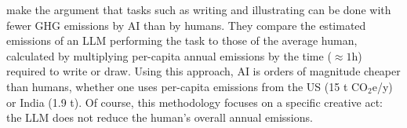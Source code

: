 \documentclass[11pt]{article}
\begin{document}
\textcite{tomlinson2024carbon} make the argument that tasks such as writing
and illustrating can be done with fewer GHG emissions by AI than by humans. They compare the
estimated emissions of an LLM performing the task to those of the average human, calculated
by multiplying per-capita annual emissions by the time ($\approx 1$h) required to write or draw.
Using this approach, AI is orders of magnitude cheaper than humans, whether one uses per-capita
emissions from the US (15 t CO$_2$e/y) or India (1.9 t). Of course, this methodology focuses on
a specific creative act: the LLM does not reduce the human's overall annual emissions.

\printbibliography
\end{document}

